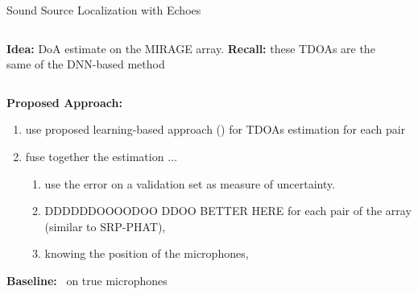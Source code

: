 \begin{frame}{Sound Source Localization \alert{with Echoes} \hfill\faMapMarked*}

    \begin{columns}[T,onlytextwidth]
    \begin{column}{0.5\textwidth}
        \begin{block}{}
                \small
                \textbf{Idea:} DoA estimate on the MIRAGE array.
                \textbf{Recall:} these TDOAs are the same of the DNN-based method
        \end{block}

    \end{column}

    \begin{column}{0.5\textwidth}
        \centering
        \end{column}
    \end{columns}


    \begin{mycontriblock}
        \textbf{Proposed Approach:}
        \begin{enumerate}
            \item use proposed learning-based approach (\MLP) for \alert{TDOAs} estimation for each pair
            \item fuse together the estimation $\ldots$
            \begin{enumerate}
                \item use the error on a validation set as measure of uncertainty.
                \item DDDDDDOOOODOO DDOO BETTER HERE
                for each pair of the \mirage array (similar to SRP-PHAT\footnotemark[1]),
                \item knowing the position of the microphones,
            \end{enumerate}
        \end{enumerate}
    \end{mycontriblock}

    \vspace{1mm}
    \begin{mysotablock}
        \textbf{Baseline:} \GCCPHAT~on true microphones\footnotemark[2]
    \end{mysotablock}

    \vspace{1mm}

\end{frame}

